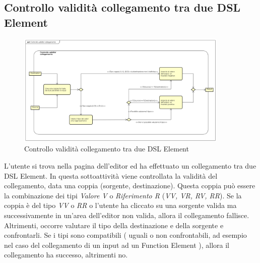     \subsection{Controllo validità collegamento tra due DSL Element}
    \begin{figure}[H]
      \centering
      \includegraphics[width=0.9\textwidth]{res/img/controlloCollegamento.png}
      \caption{Controllo validità collegamento tra due DSL Element}
      \label{fig:diagram_model}
    \end{figure}
L'utente si trova nella pagina dell'editor ed ha effettuato un collegamento tra due DSL Element. In questa sottoattività viene controllata la validità del collegamento, data una coppia (sorgente, destinazione). Questa coppia può essere la combinazione dei tipi \textit{Valore V} o \textit{Riferimento R} (\textit{VV, VR, RV, RR}). Se la coppia è del tipo \textit{VV} o \textit{RR} o l'utente ha cliccato su una sorgente valida ma successivamente in un'area dell'editor non valida, allora il collegamento fallisce. Altrimenti, occorre valutare il tipo della destinazione e della sorgente e confrontarli. Se i tipi sono compatibili ( uguali o non confrontabili, ad esempio nel caso del collegamento di un input ad un Function Element ), allora il collegamento ha successo, altrimenti no. 
